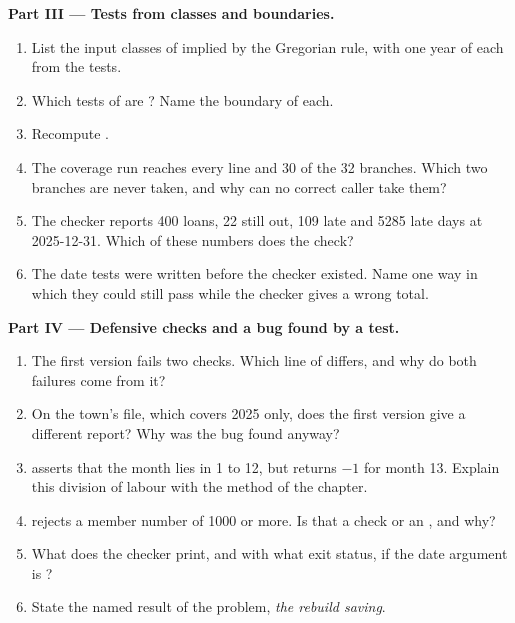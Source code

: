 \begin{problem}
\medskip\noindent\textbf{Part III --- Tests from classes and boundaries.}
\begin{enumerate}[resume]
\item List the input classes of  implied by the Gregorian rule, with one year of each from the tests.
\item Which tests of  are ? Name the boundary of each.
\item Recompute .
\item The coverage run reaches every line and 30 of the 32 branches. Which two branches are never taken, and why can no
correct caller take them?
\item The checker reports 400 loans, 22 still out, 109 late and 5285 late days at 2025-12-31. Which of these numbers does
the  check?
\item The date tests were written before the checker existed. Name one way in which they could still pass while the
checker gives a wrong total.
\end{enumerate}

\medskip\noindent\textbf{Part IV --- Defensive checks and a bug found by a test.}
\begin{enumerate}[resume]
\item The first version fails two checks. Which line of  differs, and why do both failures come from it?
\item On the town's file, which covers 2025 only, does the first version give a different report? Why was the bug found
anyway?
\item {} asserts that the month lies in 1 to 12, but  returns $-1$ for month 13.
Explain this division of labour with the method of the chapter.
\item {} rejects a member number of 1000 or more. Is that a check or an , and why?
\item What does the checker print, and with what exit status, if the date argument is ?
\item State the named result of the problem, \emph{the rebuild saving}.
\end{enumerate}
\end{problem}
